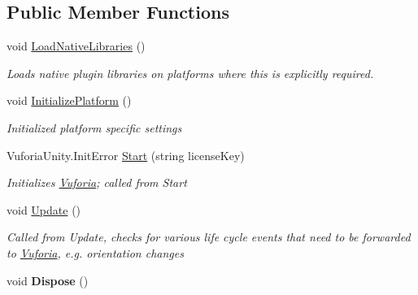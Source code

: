 \subsection*{Public Member Functions}
\begin{DoxyCompactItemize}
\item 
void \hyperlink{class_vuforia_1_1_i_o_s_unity_player_a600d381149863d17d61979ac24053917_a600d381149863d17d61979ac24053917}{Load\+Native\+Libraries} ()
\begin{DoxyCompactList}\small\item\em Loads native plugin libraries on platforms where this is explicitly required. \end{DoxyCompactList}\item 
void \hyperlink{class_vuforia_1_1_i_o_s_unity_player_a084e86df1747abb133cb0cd05dfd2260_a084e86df1747abb133cb0cd05dfd2260}{Initialize\+Platform} ()
\begin{DoxyCompactList}\small\item\em Initialized platform specific settings \end{DoxyCompactList}\item 
Vuforia\+Unity.\+Init\+Error \hyperlink{class_vuforia_1_1_i_o_s_unity_player_a6b09cc2acb4a92b36cdfa6553af88877_a6b09cc2acb4a92b36cdfa6553af88877}{Start} (string license\+Key)
\begin{DoxyCompactList}\small\item\em Initializes \hyperlink{namespace_vuforia}{Vuforia}; called from Start \end{DoxyCompactList}\item 
void \hyperlink{class_vuforia_1_1_i_o_s_unity_player_a60426bb102046a4aa2926fcd7d7f601f_a60426bb102046a4aa2926fcd7d7f601f}{Update} ()
\begin{DoxyCompactList}\small\item\em Called from Update, checks for various life cycle events that need to be forwarded to \hyperlink{namespace_vuforia}{Vuforia}, e.\+g. orientation changes \end{DoxyCompactList}\item 
\hypertarget{class_vuforia_1_1_i_o_s_unity_player_af83d5773fe8895dcab7fa4f8b2103c01}{}void {\bfseries Dispose} ()\label{class_vuforia_1_1_i_o_s_unity_player_af83d5773fe8895dcab7fa4f8b2103c01}


\end{DoxyCompactItemize}
